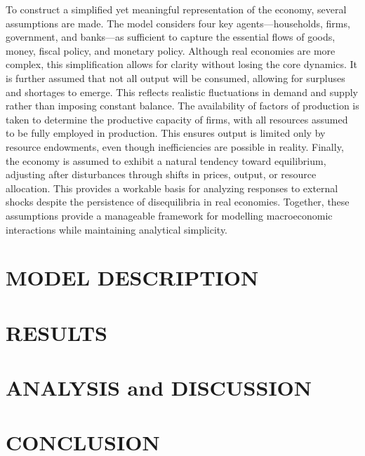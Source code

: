 \documentclass[10pt,twocolumn]{witseiepaper}
\begin{document}
To construct a simplified yet meaningful representation of the economy, several assumptions are made.  
The model considers four key agents—households, firms, government, and banks—as sufficient to capture the essential flows of goods, money, fiscal policy, and monetary policy. Although real economies are more complex, this simplification allows for clarity without losing the core dynamics.  
It is further assumed that not all output will be consumed, allowing for surpluses and shortages to emerge. This reflects realistic fluctuations in demand and supply rather than imposing constant balance.  
The availability of factors of production is taken to determine the productive capacity of firms, with all resources assumed to be fully employed in production. This ensures output is limited only by resource endowments, even though inefficiencies are possible in reality.  
Finally, the economy is assumed to exhibit a natural tendency toward equilibrium, adjusting after disturbances through shifts in prices, output, or resource allocation. This provides a workable basis for analyzing responses to external shocks despite the persistence of disequilibria in real economies.  
Together, these assumptions provide a manageable framework for modelling macroeconomic interactions while maintaining analytical simplicity.


\section{MODEL DESCRIPTION}

\section{RESULTS}

\section{ANALYSIS and DISCUSSION}

\section{CONCLUSION}


%



\end{document}

